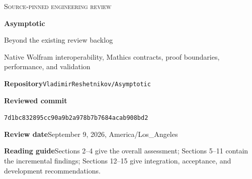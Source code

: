 \documentclass[11pt,letterpaper]{article}
\newcommand{\code}[1]{\nolinkurl{#1}}
\begin{document}
\begin{titlepage}
\vspace*{0.5in}
{\color{ink}\Large\textsc{Source-pinned engineering review}\par}
\vspace{0.4in}
{\color{ink}\Huge\bfseries Asymptotic\par}
\vspace{0.14in}
{\LARGE Beyond the existing review backlog\par}
\vspace{0.25in}
{\Large Native Wolfram interoperability, Mathics contracts,\newline
proof boundaries, performance, and validation\par}
\vspace{0.55in}
\textbf{Repository}\quad \code{VladimirReshetnikov/Asymptotic}\par
\textbf{Reviewed commit}\par
\code{7d1bc832895cc90a9b2a978b7b7684acab908bd2}\par
\textbf{Review date}\quad September 9, 2026, America/Los\_Angeles\par
\vspace{0.35in}
\begin{abstract}
This review examines the current implementation in the context of its 27
existing review packages. It does not reproduce their general backlog.
Instead, it identifies concrete Mathics adapter costs, a scale-sensitive
local-domain proof gap, two test-infrastructure weaknesses, and a bounded
special-function extension. It supplies an exact rational sign-certificate
construction, terminating hypergeometric coefficient code, an independent
frontier-cost model, a fail-closed CI inventory checker, candidate Wolfram
Language helpers, and focused reproduction probes.

The distinction between source analysis and execution is essential. Twenty
reference-check methods and nine inventory-check methods passed locally;
these test the supplied models and prototypes, not the repository package.
No package calculation was executed in Mathics or the official kernel during
this review. One limited official-kernel primitive probe succeeded. Public
witnesses that remain unexecuted are explicitly labeled. No new
package-level wrong asymptotic formula is claimed to have been reproduced.
\end{abstract}
\vfill
\textbf{Reading guide}\quad Sections 2--4 give the overall assessment;
Sections 5--11 contain the incremental findings; Sections 12--15 give
integration, acceptance, and development recommendations.
\end{titlepage}
\tableofcontents
\newpage
\end{document}

